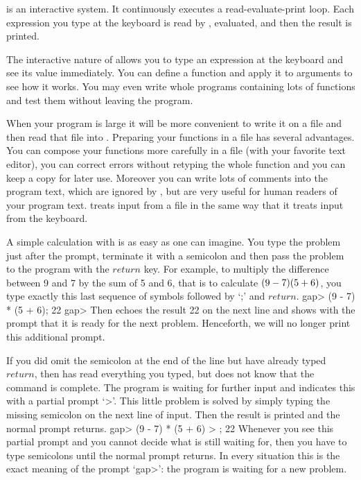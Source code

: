 \null

%
{\GAP}  is  an   interactive   system.    It  continuously   executes   a
read-evaluate-print loop.  Each  expression you type  at the  keyboard is
read by {\GAP}, evaluated, and then the result is printed.

The interactive nature of {\GAP} allows you to type  an expression at the
keyboard and see its value immediately.  You can  define a  function  and
apply it to arguments  to  see how  it  works.  You may  even write whole
programs containing lots  of functions and test them without leaving  the
program.

When  your program is large it  will be more  convenient to write it on a
file and then read that file  into {\GAP}. Preparing  your functions in a
file   has  several advantages.  You  can   compose  your functions  more
carefully in a  file (with your favorite  text  editor), you can  correct
errors without retyping  the whole function and you  can keep a  copy for
later use. Moreover you can write lots of comments into the program text,
which are ignored  by {\GAP}, but are   very useful for  human readers of
your program text. {\GAP} treats  input from a  file in the same way that
it treats input from the keyboard.

A simple calculation with {\GAP} is as easy as one can imagine.  You type
the problem just after the prompt, terminate it with a semicolon and then
pass the problem to the  program with the $return$ key.  For  example, to
multiply the difference between 9 and 7 by the sum of 5 and 6, that is to
calculate  $(9 - 7) \* (5 + 6)$, you type exactly this  last sequence  of
symbols followed by `;' and $return$.
\beginexample
    gap> (9 - 7) * (5 + 6);
    22
    gap> 
\endexample
Then {\GAP} echoes   the result 22 on the   next line and shows with  the
prompt  that it is ready  for the  next problem.  Henceforth,  we will no
longer print this additional prompt.

If you did omit the semicolon at the  end of  the  line but have  already
typed $return$, then {\GAP} has read everything you  typed, but does  not
know  that the command is  complete.  The  program is waiting for further
input and indicates this with a partial prompt `>'.   This little problem
is solved by  simply typing  the missing  semicolon on  the next line  of
input.  Then the result is printed and the normal prompt returns.
\beginexample
    gap> (9 - 7) * (5 + 6)
    > ;
    22 
\endexample
Whenever you see this partial prompt and you cannot decide what {\GAP} is
still  waiting for, then  you have  to type  semicolons  until the normal
prompt  returns.  In  every situation this  is the  exact meaning of  the
prompt `gap>': the program is waiting for a new problem.

